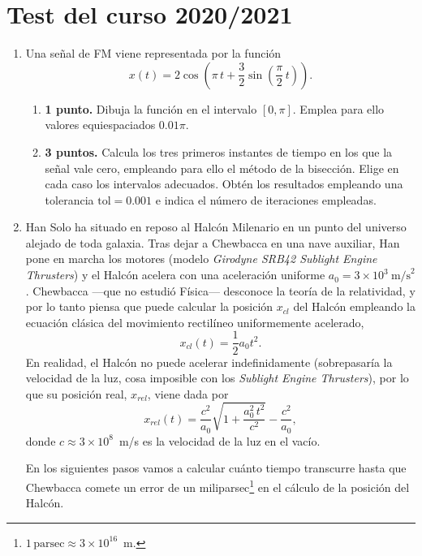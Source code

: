\section{Test del curso 2020/2021}
\begin{enumerate}
\item Una señal de FM viene representada por la función
\begin{equation*}
	x(t) = 2\cos\left(\pi \, t+ \frac{3}{2}\sin\left(\frac{\pi}{2} \, t\right)\right).
\end{equation*}
\begin{enumerate}
	\item \textbf{1 punto.} Dibuja la función en el intervalo $[0,\pi]$. Emplea para ello valores equiespaciados $0.01\pi$.
	\item \textbf{3 puntos.} Calcula los tres primeros instantes de tiempo en los que la señal vale cero, empleando para ello el método de la bisección. Elige en cada caso los intervalos adecuados. Obtén los resultados empleando una tolerancia $\text{tol}=0.001$ e indica el número de iteraciones empleadas.
\end{enumerate}

\item Han Solo ha situado en reposo al Halcón Milenario en un punto del universo alejado de toda galaxia. Tras dejar a Chewbacca en una nave auxiliar, Han pone en marcha los motores (modelo \emph{Girodyne SRB42 Sublight Engine Thrusters}) y el Halcón acelera con una aceleración uniforme $a_0 = 3\times10^3\ \text{m/s}^2$. Chewbacca ---que no estudió Física--- desconoce la teoría de la relatividad, y por lo tanto piensa que puede calcular la posición $x_{cl}$ del Halcón empleando la ecuación clásica del movimiento rectilíneo uniformemente acelerado,
\begin{equation*}
	x_{cl}(t) =\frac{1}{2}a_0t^2.
\end{equation*}
		En realidad, el Halcón no puede acelerar indefinidamente (sobrepasaría la velocidad de la luz, cosa imposible con los \emph{Sublight Engine Thrusters}), por lo que su posición real, $x_{rel}$, viene dada por
\begin{equation*}
	x_{rel}(t) = \frac{c^2}{a_0}\sqrt{1 + \frac{a_0^2\,t^2}{c^2}} -\frac{c^2}{a_0},
\end{equation*}
		donde $c \approx 3\times 10^8$~m/s es la velocidad de la luz en el vacío.

		En los siguientes pasos vamos a calcular cuánto tiempo transcurre hasta que Chewbacca comete un error de un miliparsec\footnote{$1\,\text{parsec} \approx 3\times 10^{16}$~m.} en el cálculo de la posición del Halcón.


\end{enumerate}
